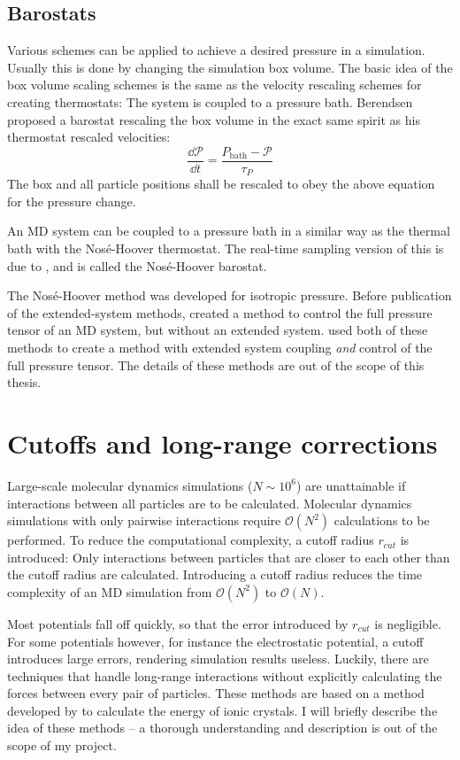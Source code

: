 \subsection{Barostats}
Various schemes can be applied to achieve a desired pressure in a simulation. Usually this is done by changing the simulation box volume. The basic idea of the box volume scaling schemes is the same as the velocity rescaling schemes for creating thermostats: The system is coupled to a pressure bath. Berendsen proposed a barostat rescaling the box volume in the exact same spirit as his thermostat rescaled velocities:
\begin{equation}
	\frac{\dd \mathcal{P}}{\dd t} = \frac{P_{\text{bath}}-\mathcal{P}}{\tau_P}
\end{equation}
The box and all particle positions shall be rescaled to obey the above equation for the pressure change. 

An MD system can be coupled to a pressure bath in a similar way as the thermal bath with the Nosé-Hoover thermostat. The real-time sampling version of this is due to \citet{Hoover1985}, and is called the Nosé-Hoover barostat.

The Nosé-Hoover method was developed for isotropic pressure. Before publication of the extended-system methods, \citet{Parrinello1981} created a method to control the full pressure tensor of an MD system, but without an extended system. \citet{Martyna1994} used both of these methods to create a method with extended system coupling \emph{and} control of the full pressure tensor. The details of these methods are out of the scope of this thesis.

\section{Cutoffs and long-range corrections}
Large-scale molecular dynamics simulations ($N \sim 10^6$) are unattainable if interactions between all particles are to be calculated. Molecular dynamics simulations with only pairwise interactions require $\mathcal{O}(N^2)$ calculations to be performed. To reduce the computational complexity, a cutoff radius $r_{cut}$ is introduced: Only interactions between particles that are closer to each other than the cutoff radius are calculated. Introducing a cutoff radius reduces the time complexity of an MD simulation from $\mathcal{O}(N^2)$ to $\mathcal{O}(N)$. 

Most potentials fall off quickly, so that the error introduced by $r_{cut}$ is negligible. For some potentials however, for instance the electrostatic potential, a cutoff introduces large errors, rendering simulation results useless. Luckily, there are techniques that handle long-range interactions without explicitly calculating the forces between every pair of particles. These methods are based on a method developed by \citet{ANDP:ANDP19213690304} to calculate the energy of ionic crystals. I will briefly describe the idea of these methods -- a thorough understanding and description is out of the scope of my project.

